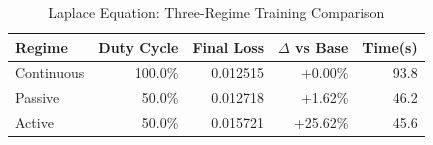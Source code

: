 \begin{table}[htbp]
\centering
\caption{Laplace Equation: Three-Regime Training Comparison}
\label{tab:laplace_regimes}
\begin{tabular}{lrrrr}
\hline
Regime & Duty Cycle & Final Loss & $\Delta$ vs Base & Time(s) \\
\hline
Continuous & 100.0\% & 0.012515 & +0.00\% & 93.8 \\
Passive & 50.0\% & 0.012718 & +1.62\% & 46.2 \\
Active & 50.0\% & 0.015721 & +25.62\% & 45.6 \\
\hline
\end{tabular}
\end{table}
